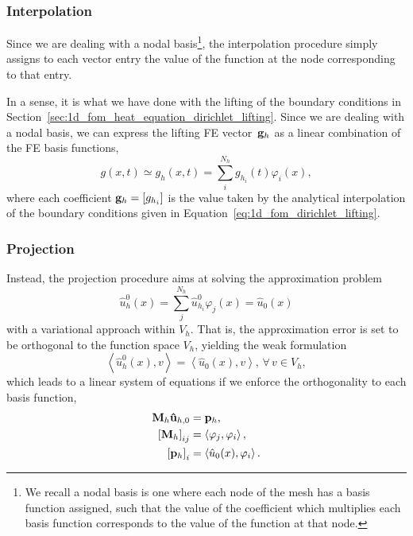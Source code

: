 \documentclass[../main.tex]{subfiles}
\newcommand{\inner}[2]{\left<#1, #2\right>}
\begin{document}
\subsubsection*{Interpolation}
Since we are dealing with a nodal basis\footnote{We recall a nodal basis is one where each node of the mesh has a basis function assigned, 
such that the value of the coefficient which multiplies each basis function corresponds to the value of the function at that node.}, 
the interpolation procedure simply assigns to each vector entry the value of the function at the node corresponding to that entry.

In a sense, it is what we have done with the lifting of the boundary conditions in Section~\ref{sec:1d_fom_heat_equation_dirichlet_lifting}.
Since we are dealing with a nodal basis, we can express the lifting FE vector~$\vb{g}_h$ as a linear combination of the FE basis functions,
\begin{equation}
    g(x,t) \simeq g_h(x,t) = \sum_i^{N_h} g_{h_i}(t) \varphi_i(x),
\end{equation}
where each coefficient $\vb{g}_h = [g_{h_i}]$ is the value taken by the analytical interpolation of the boundary conditions given in Equation~\eqref{eq:1d_fom_dirichlet_lifting}. 

\subsubsection*{Projection}
Instead, the projection procedure aims at solving the approximation problem
\begin{equation}
    \hat{u}^{0}_h(x) = \sum_j^{N_h} \hat{u}_{h_i}^0 \varphi_j(x) = \hat{u}_0(x)
\end{equation}
with a variational approach within $V_h$. 
That is, the approximation error is set to be orthogonal to the function space $V_h$, yielding the weak formulation
\begin{equation}
    \inner{\hat{u}^{0}_h(x)}{v} = \inner{\hat{u}_0(x)}{v}, \, \forall \, v \in V_h,
\end{equation}
which leads to a linear system of equations if we enforce the orthogonality to each basis function,
\begin{subequations}
    \begin{align}
        \label{eq:projection_equation}
        \vb{M}_{h} \vb{\hat{u}}_{h,0} &= \vb{p}_h, \\
        \left[\vb{M}_{h}\right]_{ij} &= \inner{\varphi_j}{\varphi_i}, \\
        \left[\vb{p}_{h}\right]_{i} &= \inner{\hat{u}_0(x)}{\varphi_i}.
    \end{align}
\end{subequations}
\end{document}
